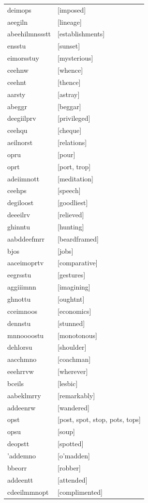 \documentclass{article}
\begin{document}
\begin{tabular}{ll}
deimops & [imposed] \\
aeegiln & [lineage] \\
abeehilmnssstt & [establishments] \\
ensstu & [sunset] \\
eimorsstuy & [mysterious] \\
ceehnw & [whence] \\
ceehnt & [thence] \\
aarsty & [astray] \\
abeggr & [beggar] \\
deegiilprv & [privileged] \\
ceehqu & [cheque] \\
aeilnorst & [relations] \\
opru & [pour] \\
oprt & [port, trop] \\
adeiimnott & [meditation] \\
ceehps & [speech] \\
degiloost & [goodliest] \\
deeeilrv & [relieved] \\
ghinntu & [hunting] \\
aabddeefmrr & [beardframed] \\
bjos & [jobs] \\
aaceimoprtv & [comparative] \\
eegrsstu & [gestures] \\
aggiiimnn & [imagining] \\
ghnottu & [oughtnt] \\
cceimnoos & [economics] \\
dennstu & [stunned] \\
mnnoooostu & [monotonous] \\
dehlorsu & [shoulder] \\
aacchmno & [coachman] \\
eeehrrvw & [wherever] \\
bceils & [lesbic] \\
aabeklmrry & [remarkably] \\
addeenrw & [wandered] \\
opst & [post, spot, stop, pots, tops] \\
opsu & [soup] \\
deopstt & [spotted] \\
'addemno & [o'madden] \\
bbeorr & [robber] \\
addeentt & [attended] \\
cdeeilmmnopt & [complimented] \\

\end{tabular}
\end{document}
